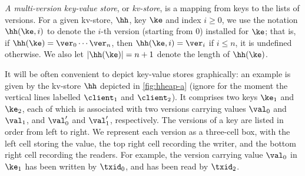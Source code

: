 \emph{A multi-version key-value store}, or \emph{kv-store}, 
is a mapping from keys to the lists of versions. 
For a given kv-store, $\hh$, key $\ke$ and index $i \geq 0$, we use the notation $\hh(\ke, i)$ 
to denote the $i$-th version (starting from $0$) installed for $\ke$; that is, if $\hh(\ke) = \ver_0 \cdots\ver_{n}$, then 
$\hh(\ke, i) = \ver_{i}$ if $i \leq n$, it is undefined otherwise. We also let $\lvert \hh(\ke) \rvert = n +1 $ denote 
the length of $\hh(\ke)$.

It will be often convenient to depict key-value stores graphically: an 
example is given by the kv-store $\hh$ depicted in \cref{fig:hheap-a}
(ignore for the moment the vertical lines labelled $\client_1$ and $\client_2$). 
It comprises two keys \( \ke_1\) and \( \ke_2 \), 
each of which is associated with two versions carrying values $\val_0$ and $\val_1$, and $\val'_0$ and $\val'_1$, respectively.
The versions of a key are listed in order from left to right. 
We represent each version as a three-cell box, with the left cell storing the value, the top right cell recording the writer, and the bottom right cell recording the readers. 
For example, the version carrying value $\val_0$ in $\ke_1$ has been written by $\txid_0$, and has been read by $\txid_2$.

